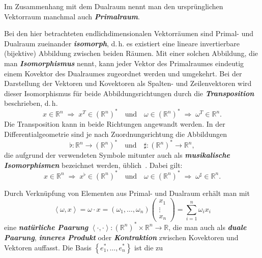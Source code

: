 Im Zusammenhang mit dem Dualraum nennt man den ursprünglichen Vektorraum
manchmal auch \textbf{\em Primalraum}.
\begin{remark}
\label{rem:Isomorphismus-Primal-Dual}Bei den hier betrachteten endlichdimensionalen
Vektorräumen sind Primal- und Dualraum zueinander \textbf{\em isomorph},
d.\,h. es existiert eine lineare invertierbare (bijektive) Abbildung
zwischen beiden Räumen.
Mit einer solchen Abbildung, die man \textbf{\em Isomorphismus}
nennt, kann jeder Vektor des Primalraumes eindeutig einem Kovektor
des Dualraumes zugeordnet werden und umgekehrt.
Bei der Darstellung
der Vektoren und Kovektoren als Spalten- und Zeilenvektoren wird dieser
Isomorphismus für beide Abbildungsrichtungen durch die \textbf{\em Transposition}
beschrieben, d.\,h.
\[
x\in{\mathbb{R}}^{n}\;\Rightarrow\;x^{T}\in({\mathbb{R}}^{n})^{*}\quad\text{und}\quad\omega\in({\mathbb{R}}^{n})^{*}\;\Rightarrow\;\omega^{T}\in{\mathbb{R}}^{n}.
\]
Die Transposition kann in beide Richtungen angewandt werden. In der
Differentialgeometrie sind je nach Zuordnungsrichtung die Abbildungen
\[
\flat:{\mathbb{R}}^{n}\to({\mathbb{R}}^{n})^{*}\quad\text{und}\quad\sharp:({\mathbb{R}}^{n})^{*}\to{\mathbb{R}}^{n},
\]
die aufgrund der verwendeten Symbole mitunter auch als \textbf{\em musikalische
Isomorphismen} bezeichnet werden,
üblich~\cite{marsden2001,bullo2004,jaenich2005}. Dabei gilt:
\[
x\in{\mathbb{R}}^{n}\;\Rightarrow\;x^{\flat}\in({\mathbb{R}}^{n})^{*}\quad\text{und}\quad\omega\in({\mathbb{R}}^{n})^{*}\;\Rightarrow\;\omega^{\sharp}\in{\mathbb{R}}^{n}.
\]
\end{remark}
Durch Verknüpfung von Elementen aus Primal- und Dualraum erhält man
mit
\begin{equation}
\left\langle \omega,x\right\rangle =\omega\cdot x=\left(\omega_{1},\ldots,\omega_{n}\right)\left(\begin{array}{c}
x_{1}\\
\vdots\\
x_{n}
\end{array}\right)=\sum_{i=1}^{n}\omega_{i}x_{i}\label{eq:inneres-produkt}
\end{equation}
eine \textbf{\em natürliche Paarung}  $\left\langle \cdot,\cdot\right\rangle :({\mathbb{R}}^{n})^{*}\times{\mathbb{R}}^{n}\to{\mathbb{R}}$,
die man auch als \textbf{\em duale Paarung}, \textbf{\em inneres Produkt}
oder \textbf{\em Kontraktion} zwischen Kovektoren und Vektoren auffasst.
Die Basis $\left\{ e_{1}^{*},\ldots,e_{n}^{*}\right\} $ ist die zu
